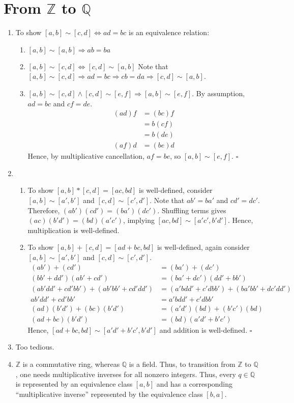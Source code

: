\documentclass{article}
\begin{document}
\section{From $\mathbb{Z}$ to $\mathbb{Q}$}
\begin{enumerate}[label=\textbf{(\alph*)}]
\item{
	To show $[a,b]\sim[c,d] \Leftrightarrow ad=bc$
	is an equivalence relation:
	\begin{enumerate}[label=(\arabic*)]
	\item{
		$[a,b]\sim[a,b] \Rightarrow ab=ba$
	}
	\item{
		$[a,b]\sim[c,d]\Leftrightarrow[c,d]\sim[a,b]$
		Note that
		$[a,b]\sim[c,d]
			\Rightarrow ad = bc
			\Rightarrow cb = da
			\Rightarrow [c,d]\sim[a,b]
		$.
	}
	\item{
		$[a,b]\sim[c,d]\wedge[c,d]\sim[e,f]\Rightarrow[a,b]\sim[e,f]$.
		By assumption, $ad=bc$ and $cf=de$.
		\begin{align*}
			(ad)f &= (bc)f \\
				  &= b(cf) \\
			      &= b(de) \\
			 (af)d&= (be)d
		\end{align*}
		Hence, by multiplicative cancellation,
		$af=be$, so $[a,b]\sim[e,f]$.
		\hfill $\square$
	}
	\end{enumerate}
}
\item{
	\begin{enumerate}[label=(\arabic*)]
	\item{
		To show $[a,b]*[c,d]=[ac,bd]$ is well-defined, consider
		$[a,b]\sim[a',b']$ and $[c,d]\sim[c',d']$.
		Note that $ab'=ba'$ and $cd'=dc'$.
		Therefore, $(ab')(cd')=(ba')(dc')$.
		Shuffling terms gives $(ac)(b'd')=(bd)(a'c')$,
		implying $[ac,bd]\sim[a'c',b'd']$.
		Hence, multiplication is well-defined.
	}
	\item{
		To show $[a,b]+[c,d]=[ad+bc,bd]$ is well-defined, again consider
		$[a,b]\sim[a',b']$ and $[c,d]\sim[c',d']$.
		\begin{align*}
			(ab')+(cd') &= (ba')+(dc')\\
			(bb'+dd')(ab'+cd') &= (ba'+dc')(dd'+bb')\\
			(ab'dd'+cd'bb')+(ab'bb'+cd'dd')
				&= (a'bdd'+c'dbb')+(ba'bb'+dc'dd')\\
			ab'dd'+cd'bb' &= a'bdd'+c'dbb'\\
			(ad)(b'd')+(bc)(b'd')
				&= (a'd')(bd)+(b'c')(bd)\\
			(ad+bc)(b'd')&=(bd)(a'd'+b'c')
		\end{align*}
		Hence, $[ad+bc,bd]\sim[a'd'+b'c',b'd']$ and
		addition is well-defined.
	}
	\hfill $\square$
	\end{enumerate}
}
\item{
	Too tedious.
}
\item{
	$\mathbb{Z}$ is a commutative ring, whereas
	$\mathbb{Q}$ is a field. Thus, to transition from
	$\mathbb{Z}$ to $\mathbb{Q}$, one needs
	multiplicative inverses for all nonzero integers.
	Thus, every $q\in\mathbb{Q}$ is represented by an
	equivalence class $[a,b]$ and has a corresponding
	``multiplicative inverse'' represented by the
	equivalence class $[b,a]$.
}
\end{enumerate}
\end{document}
